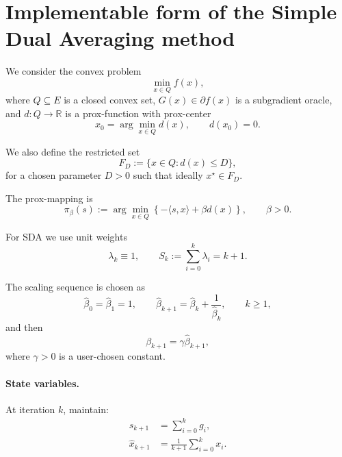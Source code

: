\documentclass[12pt,a4paper]{article}
\begin{document}
\section{Implementable form of the Simple Dual Averaging method}

We consider the convex problem
\begin{equation}
    \min_{x \in Q} f(x),
\end{equation}
where \(Q \subseteq E\) is a closed convex set, \(G(x)\in\partial f(x)\) is a subgradient
oracle, and \(d:Q\to\mathbb{R}\) is a prox-function with prox-center
\begin{equation}
    x_0 = \arg\min_{x\in Q} d(x), 
    \qquad d(x_0)=0.
\end{equation}

We also define the restricted set
\begin{equation}
    F_D := \{x\in Q : d(x)\le D\},
\end{equation}
for a chosen parameter \(D>0\) such that ideally \(x^\star \in F_D\).

The prox-mapping is
\begin{equation}
    \pi_\beta(s) := \arg\min_{x\in Q}\left\{-\langle s,x\rangle + \beta d(x)\right\},
    \qquad \beta > 0.
\end{equation}

For SDA we use unit weights
\begin{equation}
    \lambda_k \equiv 1,
    \qquad
    S_k := \sum_{i=0}^k \lambda_i = k+1.
\end{equation}

The scaling sequence is chosen as
\begin{equation}
    \hat\beta_0 = \hat\beta_1 = 1,
    \qquad
    \hat\beta_{k+1} = \hat\beta_k + \frac{1}{\hat\beta_k},
    \qquad k\ge 1,
\end{equation}
and then
\begin{equation}
    \beta_{k+1} = \gamma \hat\beta_{k+1},
\end{equation}
where \(\gamma>0\) is a user-chosen constant.

\paragraph{State variables.}
At iteration \(k\), maintain:
\begin{align}
    s_{k+1} &= \sum_{i=0}^k g_i, \\
    \hat x_{k+1} &= \frac{1}{k+1}\sum_{i=0}^k x_i.
\end{align}
\end{document}
